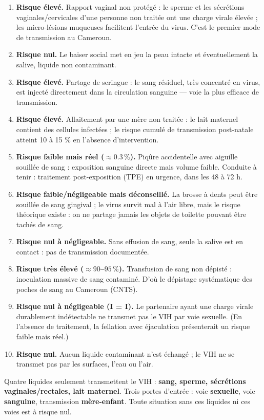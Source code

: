 \documentclass[11pt]{article}
\begin{document}
\begin{corrige}
\begin{enumerate}
    \item \textbf{Risque élevé.} Rapport vaginal non protégé : le sperme et les sécrétions vaginales/cervicales d'une personne non traitée ont une charge virale élevée ; les micro-lésions muqueuses facilitent l'entrée du virus. C'est le premier mode de transmission au Cameroun.
    \item \textbf{Risque nul.} Le baiser social met en jeu la peau intacte et éventuellement la salive, liquide non contaminant.
    \item \textbf{Risque élevé.} Partage de seringue : le sang résiduel, très concentré en virus, est injecté directement dans la circulation sanguine — voie la plus efficace de transmission.
    \item \textbf{Risque élevé.} Allaitement par une mère non traitée : le lait maternel contient des cellules infectées ; le risque cumulé de transmission post-natale atteint 10 à 15 \% en l'absence d'intervention.
    \item \textbf{Risque faible mais réel ($\approx \num{0,3}\,\%$).} Piqûre accidentelle avec aiguille souillée de sang : exposition sanguine directe mais volume faible. Conduite à tenir : traitement post-exposition (TPE) en urgence, dans les 48 à 72 h.
    \item \textbf{Risque faible/négligeable mais déconseillé.} La brosse à dents peut être souillée de sang gingival ; le virus survit mal à l'air libre, mais le risque théorique existe : on ne partage jamais les objets de toilette pouvant être tachés de sang.
    \item \textbf{Risque nul à négligeable.} Sans effusion de sang, seule la salive est en contact : pas de transmission documentée.
    \item \textbf{Risque très élevé ($\approx 90$--$95\,\%$).} Transfusion de sang non dépisté : inoculation massive de sang contaminé. D'où le dépistage systématique des poches de sang au Cameroun (CNTS).
    \item \textbf{Risque nul à négligeable (I = I).} Le partenaire ayant une charge virale durablement indétectable ne transmet pas le VIH par voie sexuelle. (En l'absence de traitement, la fellation avec éjaculation présenterait un risque faible mais réel.)
    \item \textbf{Risque nul.} Aucun liquide contaminant n'est échangé ; le VIH ne se transmet pas par les surfaces, l'eau ou l'air.
\end{enumerate}
\begin{aretenir}[À retenir]
Quatre liquides seulement transmettent le VIH : \textbf{sang, sperme, sécrétions vaginales/rectales, lait maternel}. Trois portes d'entrée : voie \textbf{sexuelle}, voie \textbf{sanguine}, transmission \textbf{mère-enfant}. Toute situation sans ces liquides ni ces voies est à risque nul.
\end{aretenir}
\end{corrige}
\end{document}
